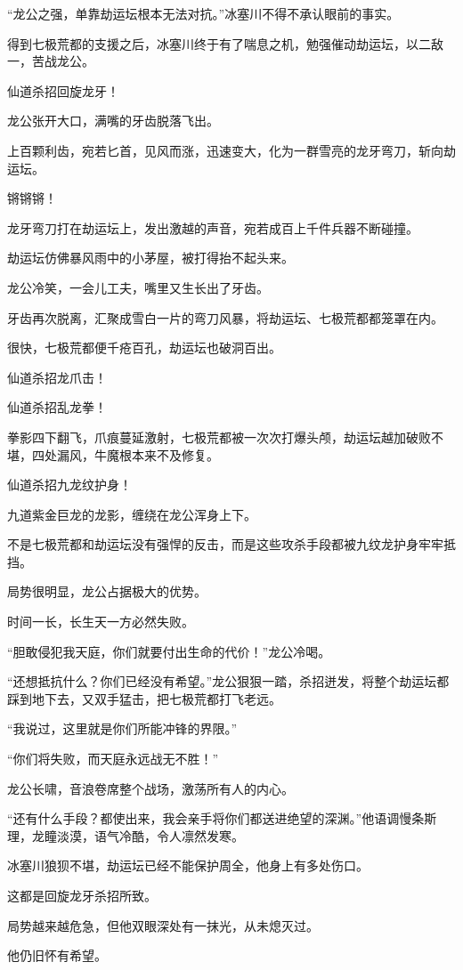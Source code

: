 \begin{this_body}
“龙公之强，单靠劫运坛根本无法对抗。”冰塞川不得不承认眼前的事实。

得到七极荒都的支援之后，冰塞川终于有了喘息之机，勉强催动劫运坛，以二敌一，苦战龙公。

仙道杀招回旋龙牙！

龙公张开大口，满嘴的牙齿脱落飞出。

上百颗利齿，宛若匕首，见风而涨，迅速变大，化为一群雪亮的龙牙弯刀，斩向劫运坛。

锵锵锵！

龙牙弯刀打在劫运坛上，发出激越的声音，宛若成百上千件兵器不断碰撞。

劫运坛仿佛暴风雨中的小茅屋，被打得抬不起头来。

龙公冷笑，一会儿工夫，嘴里又生长出了牙齿。

牙齿再次脱离，汇聚成雪白一片的弯刀风暴，将劫运坛、七极荒都都笼罩在内。

很快，七极荒都便千疮百孔，劫运坛也破洞百出。

仙道杀招龙爪击！

仙道杀招乱龙拳！

拳影四下翻飞，爪痕蔓延激射，七极荒都被一次次打爆头颅，劫运坛越加破败不堪，四处漏风，牛魔根本来不及修复。

仙道杀招九龙纹护身！

九道紫金巨龙的龙影，缠绕在龙公浑身上下。

不是七极荒都和劫运坛没有强悍的反击，而是这些攻杀手段都被九纹龙护身牢牢抵挡。

局势很明显，龙公占据极大的优势。

时间一长，长生天一方必然失败。

“胆敢侵犯我天庭，你们就要付出生命的代价！”龙公冷喝。

“还想抵抗什么？你们已经没有希望。”龙公狠狠一踏，杀招迸发，将整个劫运坛都踩到地下去，又双手猛击，把七极荒都打飞老远。

“我说过，这里就是你们所能冲锋的界限。”

“你们将失败，而天庭永远战无不胜！”

龙公长啸，音浪卷席整个战场，激荡所有人的内心。

“还有什么手段？都使出来，我会亲手将你们都送进绝望的深渊。”他语调慢条斯理，龙瞳淡漠，语气冷酷，令人凛然发寒。

冰塞川狼狈不堪，劫运坛已经不能保护周全，他身上有多处伤口。

这都是回旋龙牙杀招所致。

局势越来越危急，但他双眼深处有一抹光，从未熄灭过。

他仍旧怀有希望。


\end{this_body}
